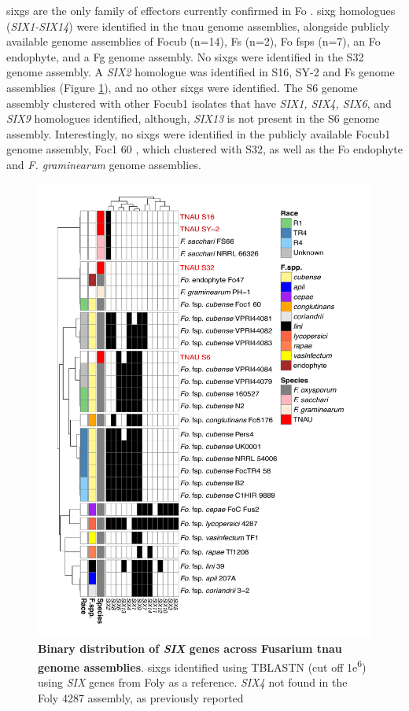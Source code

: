 \Acfp{sixg} are the only family of effectors currently confirmed in \ac{Fo} \parencite{Armitage2018, Czislowski2018}. \Ac{sixg} homologues (\textit{SIX1-SIX14}) were identified in the \ac{tnau} genome assemblies, alongside publicly available genome assemblies of \ac{Focub} (n=14), \ac{Fs} (n=2), \ac{Fo} \acp{fsp} (n=7), an \ac{Fo} endophyte, and a \acl{Fg} genome assembly. No \acp{sixg} were identified in the S32 genome assembly. A \textit{SIX2} homologue was identified in S16, SY-2  and  \ac{Fs} genome assemblies (Figure \ref{fig:SixTNAU}), and no other \acp{sixg} were identified. The S6 genome assembly clustered with other \ac{Focub1} isolates that have \textit{SIX1, SIX4, SIX6}, and \textit{SIX9} homologues identified, although, \textit{SIX13} is not present in the S6 genome assembly. Interestingly, no \acp{sixg} were identified in the publicly available \ac{Focub1} genome assembly, Foc1 60 \parencite{Yun2019}, which clustered with S32, as well as the \ac{Fo} endophyte and \textit{F. graminearum} genome assemblies. 

\begin{figure}[htp!]
  \centering
  \includegraphics[width=15cm]{Figures/SIX_Heatmap.pdf}
  \caption[Binary distribution of \textit{SIX} genes across Fusarium \ac{tnau} genome assemblies]{\textbf{Binary distribution of \textit{SIX} genes across Fusarium \ac{tnau} genome assemblies}. \aclp{sixg} identified using TBLASTN (cut off 1\-e\textsuperscript{6}) using \textit{SIX} genes from \acl{Foly} as a reference. \textit{SIX4} not found in the \acl{Foly} 4287 assembly, as previously reported \parencite{Czislowski2018}}
  \label{fig:SixTNAU}
\end{figure}

